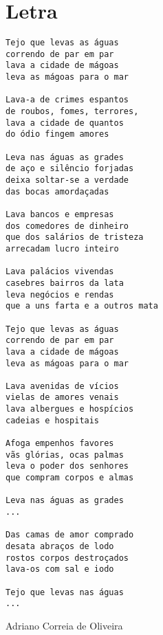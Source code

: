 \documentclass[12pt]{article}
\begin{document}
\maketitle
\section*{Letra}
\begin{center}
\begin{verbatim}
Tejo que levas as águas
correndo de par em par
lava a cidade de mágoas
leva as mágoas para o mar

Lava-a de crimes espantos
de roubos, fomes, terrores,
lava a cidade de quantos
do ódio fingem amores

Leva nas águas as grades
de aço e silêncio forjadas
deixa soltar-se a verdade
das bocas amordaçadas

Lava bancos e empresas
dos comedores de dinheiro
que dos salários de tristeza
arrecadam lucro inteiro

Lava palácios vivendas
casebres bairros da lata
leva negócios e rendas 
que a uns farta e a outros mata

Tejo que levas as águas
correndo de par em par
lava a cidade de mágoas
leva as mágoas para o mar

Lava avenidas de vícios
vielas de amores venais
lava albergues e hospícios
cadeias e hospitais

Afoga empenhos favores
vãs glórias, ocas palmas
leva o poder dos senhores
que compram corpos e almas

Leva nas águas as grades
...

Das camas de amor comprado
desata abraços de lodo
rostos corpos destroçados
lava-os com sal e iodo

Tejo que levas nas águas
...
\end{verbatim}
\vspace{5mm}
\hfill  Adriano Correia de Oliveira 
\end{center}
\end{document}
